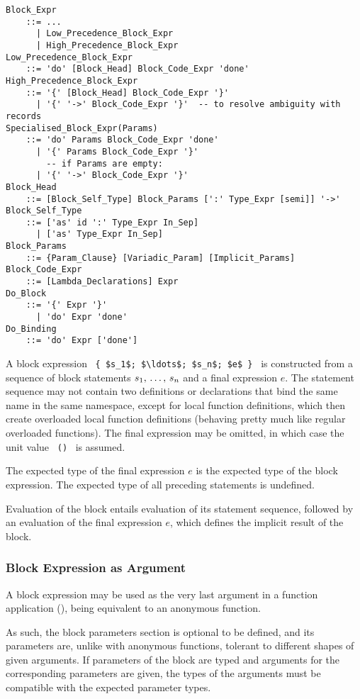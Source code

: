 \grammar\begin{lstlisting}
Block_Expr 
    ::= ...
      | Low_Precedence_Block_Expr
      | High_Precedence_Block_Expr
Low_Precedence_Block_Expr
    ::= 'do' [Block_Head] Block_Code_Expr 'done'
High_Precedence_Block_Expr
    ::= '{' [Block_Head] Block_Code_Expr '}'
      | '{' '->' Block_Code_Expr '}'  -- to resolve ambiguity with records
Specialised_Block_Expr(Params)
    ::= 'do' Params Block_Code_Expr 'done'
      | '{' Params Block_Code_Expr '}'
        -- if Params are empty:
      | '{' '->' Block_Code_Expr '}'
Block_Head
    ::= [Block_Self_Type] Block_Params [':' Type_Expr [semi]] '->'
Block_Self_Type
    ::= ['as' id ':' Type_Expr In_Sep]
      | ['as' Type_Expr In_Sep]
Block_Params
    ::= {Param_Clause} [Variadic_Param] [Implicit_Params]
Block_Code_Expr
    ::= [Lambda_Declarations] Expr
Do_Block 
    ::= '{' Expr '}' 
      | 'do' Expr 'done'
Do_Binding 
    ::= 'do' Expr ['done']
\end{lstlisting}

A block expression ~\lstinline!{ $s_1$; $\ldots$; $s_n$; $e$ }!~ is constructed from a sequence of block statements $s_1 ,\, \ldots ,\, s_n$ and a final expression $e$. The statement sequence may not contain two definitions or declarations that bind the same name in the same namespace, except for local function definitions, which then create overloaded local function definitions (behaving pretty much like regular overloaded functions). The final expression may be omitted, in which case the unit value ~\lstinline!()!~ is assumed. 

The expected type of the final expression $e$ is the expected type of the block expression. The expected type of all preceding statements is undefined. 

Evaluation of the block entails evaluation of its statement sequence, followed by an evaluation of the final expression $e$, which defines the implicit result of the block. 





\subsubsection{Block Expression as Argument}
\label{sec:block-arguments}

A block expression may be used as the very last argument in a function application (), being equivalent to an anonymous function. 

As such, the block parameters section is optional to be defined, and its parameters are, unlike with anonymous functions, tolerant to different shapes of given arguments. If parameters of the block are typed and arguments for the corresponding parameters are given, the types of the arguments must be compatible with the expected parameter types. 

